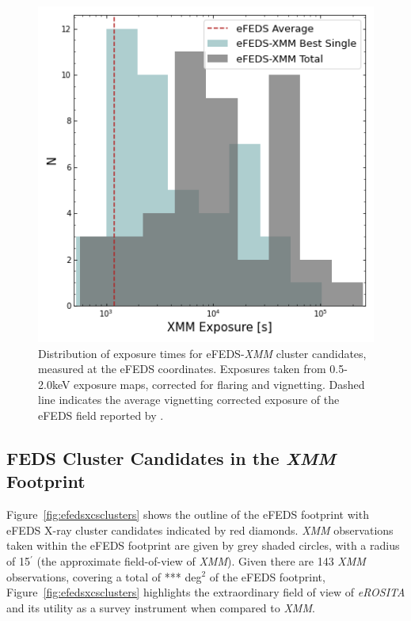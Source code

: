 \documentclass[fleqn,usenatbib]{mnras}
\begin{document}
\begin{figure}
    \centering
    \includegraphics[width=0.95\columnwidth]{images/xmm_exposures.png}
    \caption[]{Distribution of exposure times for eFEDS-{\em XMM} cluster candidates, measured at the eFEDS coordinates. Exposures taken from 0.5-2.0keV exposure maps, corrected for flaring and vignetting. Dashed line indicates the average vignetting corrected exposure of the eFEDS field reported by \cite{efedsclustercat}.}
    \label{fig:xmmexposure}
\end{figure}

\subsection{FEDS Cluster Candidates in the {\em XMM} Footprint}
\label{sec:eFEDS-XMM}

Figure~\ref{fig:efedsxcsclusters} shows the outline of the eFEDS footprint with eFEDS X-ray cluster candidates \citep{efedsclustercat} indicated by red diamonds. {\em XMM} observations taken within the eFEDS footprint are given by grey shaded circles, with a radius of 15$^{\prime}$ (the approximate field-of-view of {\em XMM}). Given there are 143 {\em XMM} observations, covering a total of {\color{red} ***} deg$^{2}$ of the eFEDS footprint, Figure~\ref{fig:efedsxcsclusters} highlights the extraordinary field of view of {\em eROSITA} and its utility as a survey instrument when compared to {\em XMM}. 
\end{document}
